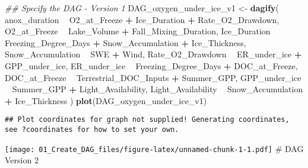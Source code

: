 \documentclass[]{article}
\newenvironment{Shaded}{\begin{snugshade}}{\end{snugshade}}
\newcommand{\CommentTok}[1]{\textcolor[rgb]{0.56,0.35,0.01}{\textit{#1}}}
\newcommand{\KeywordTok}[1]{\textcolor[rgb]{0.13,0.29,0.53}{\textbf{#1}}}
\newcommand{\NormalTok}[1]{#1}
\newcommand{\OperatorTok}[1]{\textcolor[rgb]{0.81,0.36,0.00}{\textbf{#1}}}
\newcommand{\StringTok}[1]{\textcolor[rgb]{0.31,0.60,0.02}{#1}}
\begin{document}
\begin{Shaded}
\begin{Highlighting}[]
\CommentTok{## Specify the DAG - Version 1}
\NormalTok{DAG_oxygen_under_ice_v1 <-}\StringTok{ }\KeywordTok{dagify}\NormalTok{(}
\NormalTok{  anox_duration }\OperatorTok{~}\StringTok{ }\NormalTok{O2_at_Freeze }\OperatorTok{+}\StringTok{ }\NormalTok{Ice_Duration }\OperatorTok{+}\StringTok{ }\NormalTok{Rate_O2_Drawdown,}
\NormalTok{  O2_at_Freeze }\OperatorTok{~}\StringTok{ }\NormalTok{Lake_Volume }\OperatorTok{+}\StringTok{ }\NormalTok{Fall_Mixing_Duration,}
\NormalTok{  Ice_Duration }\OperatorTok{~}\StringTok{ }\NormalTok{Freezing_Degree_Days }\OperatorTok{+}\StringTok{ }\NormalTok{Snow_Accumulation }\OperatorTok{+}\StringTok{ }\NormalTok{Ice_Thickness, }
\NormalTok{  Snow_Accumulation }\OperatorTok{~}\StringTok{ }\NormalTok{SWE }\OperatorTok{+}\StringTok{ }\NormalTok{Wind,}
\NormalTok{  Rate_O2_Drawdown }\OperatorTok{~}\StringTok{ }\NormalTok{ER_under_ice }\OperatorTok{+}\StringTok{ }\NormalTok{GPP_under_ice, }
\NormalTok{  ER_under_ice }\OperatorTok{~}\StringTok{ }\NormalTok{Freezing_Degree_Days }\OperatorTok{+}\StringTok{ }\NormalTok{DOC_at_Freeze,}
\NormalTok{  DOC_at_Freeze }\OperatorTok{~}\StringTok{ }\NormalTok{Terrestrial_DOC_Inputs }\OperatorTok{+}\StringTok{ }\NormalTok{Summer_GPP, }
\NormalTok{  GPP_under_ice }\OperatorTok{~}\StringTok{ }\NormalTok{Summer_GPP }\OperatorTok{+}\StringTok{ }\NormalTok{Light_Availability,}
\NormalTok{  Light_Availability }\OperatorTok{~}\StringTok{ }\NormalTok{Snow_Accumulation }\OperatorTok{+}\StringTok{ }\NormalTok{Ice_Thickness}
\NormalTok{)}
\KeywordTok{plot}\NormalTok{(DAG_oxygen_under_ice_v1)}
\end{Highlighting}
\end{Shaded}

\begin{verbatim}
## Plot coordinates for graph not supplied! Generating coordinates, see ?coordinates for how to set your own.
\end{verbatim}

\texttt{[image: 01\_Create\_DAG\_files/figure-latex/unnamed-chunk-1-1.pdf]}
\# DAG Version 2
\end{document}
